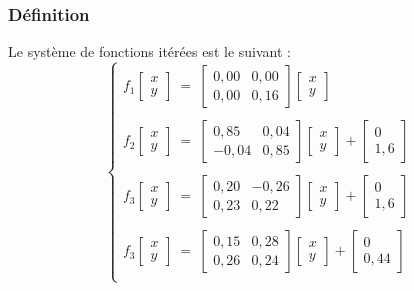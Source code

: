 \documentclass[a4paper,10pt]{report}
\begin{document}
\subsubsection{Définition}
Le système de fonctions itérées est le suivant :
\begin{equation}
\left\lbrace
\begin{array}{l}
f_1\left[ \begin{array}{c} x \\ y \end{array} \right]\ = \ \left[ \begin{array}{cc} 0,00 & 0,00 \\ 0,00 & 0,16 \end{array} \right] \left[ \begin{array}{c} x \\ y \end{array} \right]\\
\\
f_2\left[ \begin{array}{c} x \\ y \end{array} \right]\ = \ \left[ \begin{array}{cc} 0,85 & 0,04 \\ -0,04 & 0,85 \end{array} \right] \left[ \begin{array}{c} x \\ y \end{array} \right] + \left[ \begin{array}{l} 0 \\ 1,6 \end{array} \right] \\
\\
f_3\left[ \begin{array}{c} x \\ y \end{array} \right]\ = \ \left[ \begin{array}{cc} 0,20 & -0,26 \\ 0,23 & 0,22 \end{array} \right] \left[ \begin{array}{c} x \\ y \end{array} \right] + \left[ \begin{array}{l} 0 \\ 1,6 \end{array} \right] \\
\\
f_3\left[ \begin{array}{c} x \\ y \end{array} \right]\ = \ \left[ \begin{array}{cc} 0,15 & 0,28 \\ 0,26 & 0,24 \end{array} \right] \left[ \begin{array}{c} x \\ y \end{array} \right] + \left[ \begin{array}{l} 0 \\ 0,44 \end{array} \right] \\

\end{array}
\end{equation}
\end{document}
